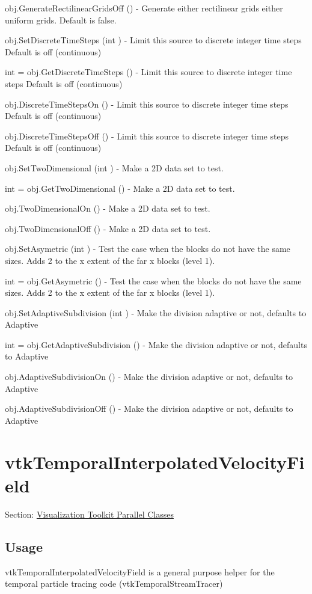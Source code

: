 \begin{DoxyItemize}
\item {\ttfamily obj.\-Generate\-Rectilinear\-Grids\-Off ()} -\/ Generate either rectilinear grids either uniform grids. Default is false.  
\item {\ttfamily obj.\-Set\-Discrete\-Time\-Steps (int )} -\/ Limit this source to discrete integer time steps Default is off (continuous)  
\item {\ttfamily int = obj.\-Get\-Discrete\-Time\-Steps ()} -\/ Limit this source to discrete integer time steps Default is off (continuous)  
\item {\ttfamily obj.\-Discrete\-Time\-Steps\-On ()} -\/ Limit this source to discrete integer time steps Default is off (continuous)  
\item {\ttfamily obj.\-Discrete\-Time\-Steps\-Off ()} -\/ Limit this source to discrete integer time steps Default is off (continuous)  
\item {\ttfamily obj.\-Set\-Two\-Dimensional (int )} -\/ Make a 2\-D data set to test.  
\item {\ttfamily int = obj.\-Get\-Two\-Dimensional ()} -\/ Make a 2\-D data set to test.  
\item {\ttfamily obj.\-Two\-Dimensional\-On ()} -\/ Make a 2\-D data set to test.  
\item {\ttfamily obj.\-Two\-Dimensional\-Off ()} -\/ Make a 2\-D data set to test.  
\item {\ttfamily obj.\-Set\-Asymetric (int )} -\/ Test the case when the blocks do not have the same sizes. Adds 2 to the x extent of the far x blocks (level 1).  
\item {\ttfamily int = obj.\-Get\-Asymetric ()} -\/ Test the case when the blocks do not have the same sizes. Adds 2 to the x extent of the far x blocks (level 1).  
\item {\ttfamily obj.\-Set\-Adaptive\-Subdivision (int )} -\/ Make the division adaptive or not, defaults to Adaptive  
\item {\ttfamily int = obj.\-Get\-Adaptive\-Subdivision ()} -\/ Make the division adaptive or not, defaults to Adaptive  
\item {\ttfamily obj.\-Adaptive\-Subdivision\-On ()} -\/ Make the division adaptive or not, defaults to Adaptive  
\item {\ttfamily obj.\-Adaptive\-Subdivision\-Off ()} -\/ Make the division adaptive or not, defaults to Adaptive  
\end{DoxyItemize}\hypertarget{vtkparallel_vtktemporalinterpolatedvelocityfield}{}\section{vtk\-Temporal\-Interpolated\-Velocity\-Field}\label{vtkparallel_vtktemporalinterpolatedvelocityfield}
Section\-: \hyperlink{sec_vtkparallel}{Visualization Toolkit Parallel Classes} \hypertarget{vtkwidgets_vtkxyplotwidget_Usage}{}\subsection{Usage}\label{vtkwidgets_vtkxyplotwidget_Usage}
vtk\-Temporal\-Interpolated\-Velocity\-Field is a general purpose helper for the temporal particle tracing code (vtk\-Temporal\-Stream\-Tracer)

